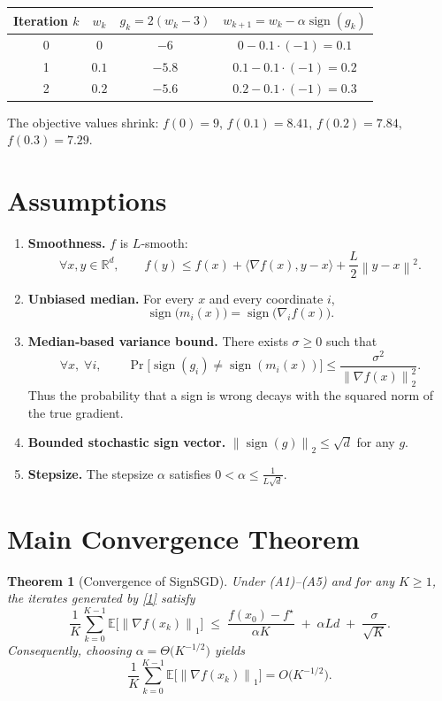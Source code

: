 \documentclass{article}
\newtheorem{theorem}{Theorem}
\newcommand{\E}{\mathbb{E}}
\newcommand{\sign}{\operatorname{sign}}
\newcommand{\norm}[1]{\left\|#1\right\|}
\newcommand{\ip}[2]{\langle #1,#2\rangle}
\begin{document}
\begin{center}
\begin{tabular}{c|c|c|c}
Iteration $k$ & $w_k$ & $g_k=2(w_k-3)$ & $w_{k+1}=w_k-\alpha\sign(g_k)$\\\hline
0 & $0$ & $-6$ & $0-0.1\cdot(-1)=0.1$\\
1 & $0.1$ & $-5.8$ & $0.1-0.1\cdot(-1)=0.2$\\
2 & $0.2$ & $-5.6$ & $0.2-0.1\cdot(-1)=0.3$\\
\end{tabular}
\end{center}
The objective values shrink:
$f(0)=9$, $f(0.1)=8.41$, $f(0.2)=7.84$, $f(0.3)=7.29$.

\section*{Assumptions}
\begin{enumerate}[label=(A\arabic*)]
\item \textbf{Smoothness.} $f$ is $L$‑smooth:
\[
\forall x,y\in\mathbb{R}^d,\qquad
f(y)\le f(x)+\ip{\nabla f(x)}{y-x}+\frac{L}{2}\norm{y-x}^2 .
\tag{A1}
\]
\item \textbf{Unbiased median.} For every $x$ and every coordinate $i$,
\[
\sign\bigl(m_i(x)\bigr)=\sign\bigl(\nabla_i f(x)\bigr) .
\tag{A2}
\]
\item \textbf{Median‑based variance bound.} There exists $\sigma\ge0$ such that
\[
\forall x,\;\forall i,\qquad
\Pr\!\bigl[\sign(g_i)\neq\sign(m_i(x))\bigr]\le\frac{\sigma^2}{\norm{\nabla f(x)}_2^2} .
\tag{A3}
\]
Thus the probability that a sign is wrong decays with the squared norm of the true gradient.
\item \textbf{Bounded stochastic sign vector.} $\norm{\sign(g)}_2\le \sqrt{d}$ for any $g$.
\item \textbf{Stepsize.} The stepsize $\alpha$ satisfies $0<\alpha\le \frac{1}{L\sqrt{d}}$.
\end{enumerate}

\section*{Main Convergence Theorem}
\begin{theorem}[Convergence of SignSGD]\label{thm:main}
Under (A1)–(A5) and for any $K\ge 1$, the iterates generated by \eqref{1} satisfy
\[
\frac{1}{K}\sum_{k=0}^{K-1}\E\!\bigl[\norm{\nabla f(x_k)}_1\bigr]
\;\le\;
\frac{f(x_0)-f^\star}{\alpha K}
\;+\;
\alpha L d
\;+\;
\frac{\sigma}{\sqrt{K}} .
\tag{2}
\]
Consequently, choosing $\alpha=\Theta\!\bigl(K^{-1/2}\bigr)$ yields
\[
\frac{1}{K}\sum_{k=0}^{K-1}\E\!\bigl[\norm{\nabla f(x_k)}_1\bigr]=O\!\bigl(K^{-1/2}\bigr) .
\]
\end{theorem}
\end{document}
